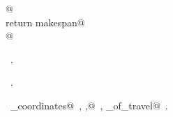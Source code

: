 \documentclass[10pt, english, oneside]{report}
\begin{document}
\begin{flushleft}
\begin{minipage}{\linewidth}
\begin{list}{}{}
\mbox{}\verb@    @\\
\mbox{}\verb@    return makespan@\\
\mbox{}\verb@  @\\
\mbox{}\verb@@{\NWsep}
\end{list}
\vspace{-1.5ex}
\footnotesize
\begin{list}{}{\setlength{\itemsep}{-\parsep}\setlength{\itemindent}{-\leftmargin}}
\item \NWtxtMacroDefBy\ .
\item \NWtxtMacroRefIn\ .
\item \NWtxtIdentsDefed\nobreak\  \verb@extract_coordinates@\nobreak\ , \verb@makespan,@\nobreak\ \NWtxtIdentsNotUsed, \verb@time_of_travel@\nobreak\ .
\item{}
\end{list}
\end{minipage}\vspace{4ex}
\end{flushleft}
\end{document}
